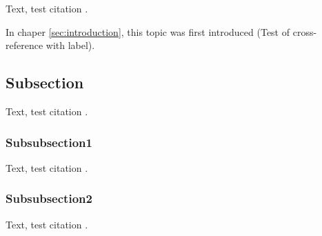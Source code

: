 Text, test citation \cite{web:website}.

In chaper \ref{sec:introduction}, this topic was first introduced (Test of
cross-reference with label).

\subsection{Subsection}
Text, test citation \cite{article:article}.
\subsubsection{Subsubsection1}
Text, test citation \cite{unpublished:unpublished}.
\subsubsection{Subsubsection2}
Text, test citation \cite{book:book}.

